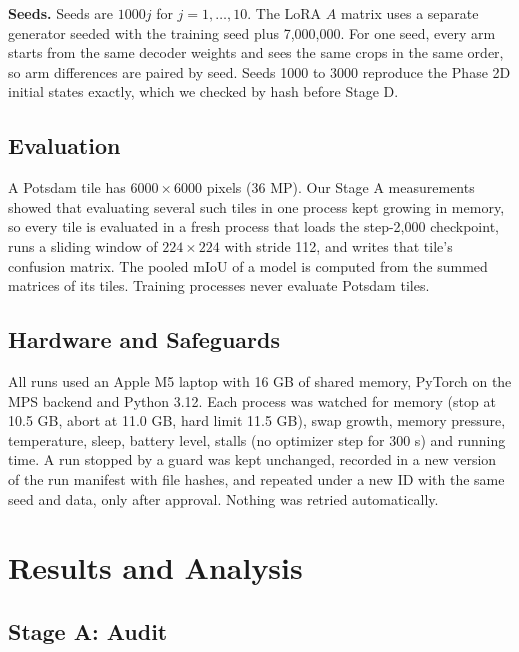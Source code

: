 \documentclass[11pt,a4paper]{report}
\begin{document}
\textbf{Seeds.} Seeds are $1000j$ for $j = 1, \dots, 10$. The LoRA $A$ matrix uses a separate generator seeded with the training seed plus 7,000,000. For one seed, every arm starts from the same decoder weights and sees the same crops in the same order, so arm differences are paired by seed. Seeds 1000 to 3000 reproduce the Phase 2D initial states exactly, which we checked by hash before Stage D.

\section{Evaluation}

A Potsdam tile has $6000 \times 6000$ pixels (36 MP). Our Stage A measurements showed that evaluating several such tiles in one process kept growing in memory, so every tile is evaluated in a fresh process that loads the step-2,000 checkpoint, runs a sliding window of $224 \times 224$ with stride 112, and writes that tile's confusion matrix. The pooled mIoU of a model is computed from the summed matrices of its tiles. Training processes never evaluate Potsdam tiles.

\section{Hardware and Safeguards}

All runs used an Apple M5 laptop with 16 GB of shared memory, PyTorch on the MPS backend and Python 3.12. Each process was watched for memory (stop at 10.5 GB, abort at 11.0 GB, hard limit 11.5 GB), swap growth, memory pressure, temperature, sleep, battery level, stalls (no optimizer step for 300 s) and running time. A run stopped by a guard was kept unchanged, recorded in a new version of the run manifest with file hashes, and repeated under a new ID with the same seed and data, only after approval. Nothing was retried automatically.

\chapter{Results and Analysis}
\label{ch:results}

\section{Stage A: Audit}
\end{document}
